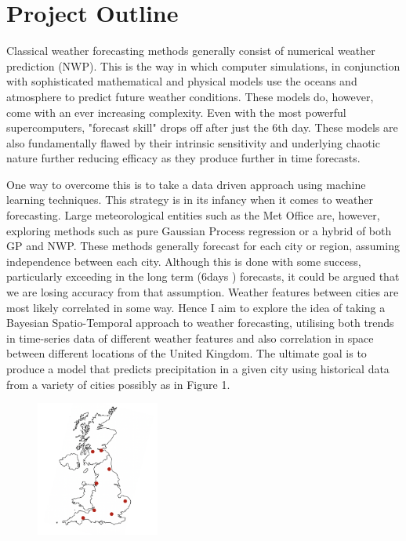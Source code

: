 \section{Project Outline}

Classical weather forecasting methods generally consist of numerical weather prediction (NWP). This is the way in which computer simulations, in conjunction with sophisticated mathematical and physical models use the oceans and atmosphere to predict future weather conditions. These models do, however, come with an ever increasing complexity. Even with the most powerful supercomputers, "forecast skill" drops off after just the 6th day. These models are also fundamentally flawed by their intrinsic sensitivity and underlying chaotic nature further reducing efficacy as they produce further in time forecasts.

One way to overcome this is to take a data driven approach using machine learning techniques. This strategy is in its infancy when it comes to weather forecasting. Large meteorological entities such as the Met Office are, however, exploring methods such as pure Gaussian Process regression or a hybrid of both GP and NWP. These methods generally forecast for each city or region, assuming independence between each city. Although this is done with some success, particularly exceeding in the long term (6days \text{+}) forecasts, it could be argued that we are losing accuracy from that assumption. Weather features between cities are most likely correlated in some way. Hence I aim to explore the idea of taking a Bayesian Spatio-Temporal approach to weather forecasting, utilising both trends in time-series data of different weather features and also correlation in space between different locations of the United Kingdom. The ultimate goal is to produce a model that predicts precipitation in a given city using historical data from a variety of cities possibly as in Figure 1.

\begin{figure}[h]
      \centering
      \includegraphics[width = 0.36\textwidth]{images/ukMap.png}
      
      \label{fig:ukMap}
  \end{figure}
  
